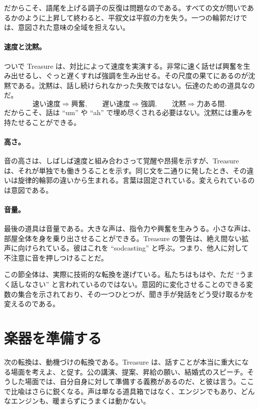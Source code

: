 だからこそ、語尾を上げる調子の反復は問題なのである。すべての文が問いであるかのように上昇して終わると、平叙文は平叙の力を失う。一つの輪郭だけでは、意図された意味の全域を担えない。

\paragraph{速度と沈黙。} ついで Treasure は、対比によって速度を実演する。非常に速く話せば興奮を生み出せるし、ぐっと遅くすれば強調を生み出せる。その尺度の果てにあるのが沈黙である。沈黙は、話し続けられなかった失敗ではない。伝達のための道具なのだ。
\begin{equation}
\text{速い速度} \Rightarrow \text{興奮},
\qquad
\text{遅い速度} \Rightarrow \text{強調},
\qquad
\text{沈黙} \Rightarrow \text{力ある間}.
\end{equation}
だからこそ、話は ``um'' や ``ah'' で埋め尽くされる必要はない。沈黙には重みを持たせることができる。

\paragraph{高さ。} 音の高さは、しばしば速度と組み合わさって覚醒や昂揚を示すが、Treasure は、それが単独でも働きうることを示す。同じ文を二通りに発したとき、その違いは旋律的輪郭の違いから生まれる。言葉は固定されている。変えられているのは意図である。

\paragraph{音量。} 最後の道具は音量である。大きな声は、指令力や興奮を生みうる。小さな声は、部屋全体を身を乗り出させることができる。Treasure の警告は、絶え間ない拡声に向けられている。彼はこれを ``sodcasting'' と呼ぶ。つまり、他人に対して不注意に音を押しつけることだ。

この節全体は、実際に技術的な転換を遂げている。私たちはもはや、ただ ``うまく話しなさい'' と言われているのではない。意図的に変化させることのできる変数の集合を示されており、その一つひとつが、聞き手が発話をどう受け取るかを変えるのである。

\section{楽器を準備する}

次の転換は、動機づけの転換である。Treasure は、話すことが本当に重大になる場面を考えよ、と促す。公の講演、提案、昇給の願い、結婚式のスピーチ。そうした場面では、自分自身に対して準備する義務があるのだ、と彼は言う。ここで比喩はさらに鋭くなる。声は単なる道具箱ではなく、エンジンでもあり、どんなエンジンも、暖まらずにうまくは動かない。

